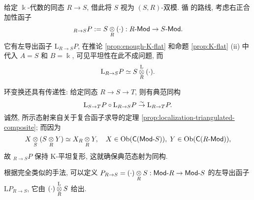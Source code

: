\begin{example}\label{eg:change-of-rings}
	给定 $\Bbbk$-代数的同态 $R \to S$, 借此将 $S$ 视为 $(S, R)$-双模. 循 \cite[推论 6.6.8]{Li1} 的路线, 考虑右正合加性函子
	\begin{equation*}
		{}_{R \to S} P := S \dotimes{R} (\cdot): R\dcate{Mod} \to S\dcate{Mod} .
	\end{equation*}
	它有左导出函子 $\mathrm{L}{}_{R \to S} P$, 在推论 \ref{prop:enough-K-flat} 和命题 \ref{prop:K-flat} (ii) 中代入 $A = S$ 和 $B = \Bbbk$, 可见平坦性在此不成问题, 而
	\[ \mathrm{L}{}_{R \to S} P \simeq S \otimesL[R] (\cdot) . \]
	
	环变换还具有传递性: 给定同态 $R \to S \to T$, 则有典范同构
	\[ \mathrm{L} {}_{S \to T} P \circ \mathrm{L} {}_{R \to S} P \rightiso \mathrm{L} {}_{R \to T} P. \]
	诚然, 所示态射来自关于复合函子求导的定理 \ref{prop:localization-triangulated-composite}; 而因为
	\[ X \dotimes{S} (S \dotimes{R} Y) \simeq X_R \dotimes{R} Y, \quad X \in \Obj(\cate{C}(\cated{Mod}S)), \; Y \in \Obj(\cate{C}(R\dcate{Mod})), \]
	故 ${}_{R \to S} P$ 保持 K-平坦复形, 这就确保典范态射为同构.
	
	根据完全类似的手法, 可以定义 $P_{R \to S} = (\cdot) \dotimes{R} S: \cated{Mod}R \to \cated{Mod}S$ 的左导出函子 $\mathrm{L}P_{R \to S}$, 它由 $(\cdot) \otimesL[R] S$ 给出.
\end{example}


